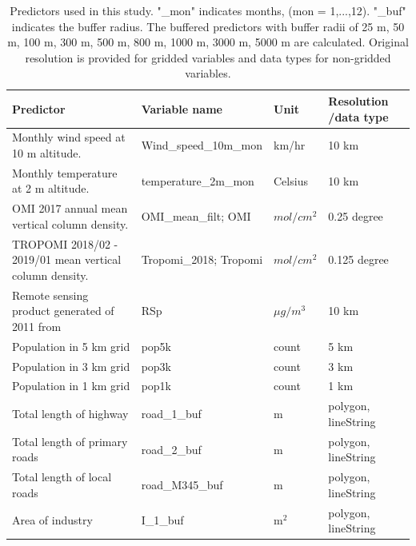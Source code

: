 \documentclass{article}
\begin{document}
  
\begin{table}[H] 
\centering
\caption{Predictors used in this study. "\_mon" indicates months, (mon = 1,...,12).  "\_buf" indicates the buffer radius. The buffered predictors with buffer radii of 25 m, 50 m, 100 m, 300 m, 500 m, 800 m, 1000 m, 3000 m, 5000 m are calculated. Original resolution is provided for gridded variables and data types for non-gridded variables.}
\label{tab:prevar}
{
\begin{tabular}{p{6cm}|l|l|l}
\hline
Predictor                                    & Variable name                & Unit         & Resolution /data type         \\ \hline
Monthly wind speed at 10 m altitude. &  Wind\_speed\_10m\_mon   & km/hr         &    10 km \\ \hline
Monthly temperature at 2 m altitude.  & temperature\_2m\_mon  &  Celsius        &    10 km \\ \hline
OMI 2017 annual mean vertical column density. & OMI\_mean\_filt; OMI &  $mol /cm^2$ &    0.25 degree \\ \hline
 
TROPOMI 2018/02 - 2019/01 mean vertical column density.  & Tropomi\_2018; Tropomi&  $mol /cm^2$ &    0.125 degree \\ \hline

Remote sensing product generated of 2011 from \cite{geddes2016long} & RSp &$\mu g/ m^3$ & 10 km \\ \hline
Population in 5 km grid  & pop5k & count  & 5 km \\ \hline
Population in 3 km grid & pop3k & count  & 3 km \\ \hline
Population in 1 km grid  & pop1k & count  & 1 km\\ \hline
 
Total length of highway  & road\_1\_buf  & m &polygon, lineString              \\\hline
Total length of primary roads                   & road\_2\_buf          & m  &polygon, lineString            \\\hline
Total length of local roads     & road\_M345\_buf        & m  &polygon, lineString               \\\hline
Area of industry                                    & I\_1\_buf           & m$^2$ &polygon, lineString            \\\hline
  
\end{tabular}
}  
\end{table}
\end{document}
